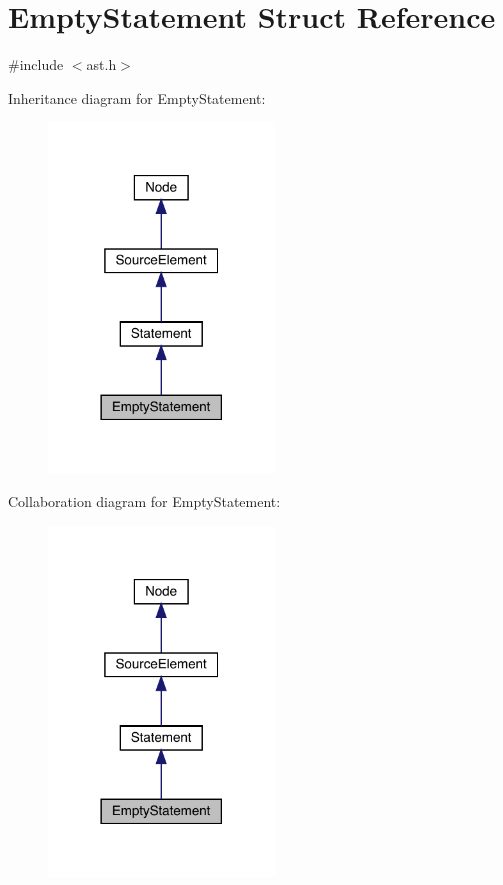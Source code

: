 \hypertarget{struct_empty_statement}{}\section{Empty\+Statement Struct Reference}
\label{struct_empty_statement}


{\ttfamily \#include $<$ast.\+h$>$}



Inheritance diagram for Empty\+Statement\+:\nopagebreak
\begin{figure}[H]
\begin{center}
\leavevmode
\includegraphics[width=170pt]{struct_empty_statement__inherit__graph}
\end{center}
\end{figure}


Collaboration diagram for Empty\+Statement\+:\nopagebreak
\begin{figure}[H]
\begin{center}
\leavevmode
\includegraphics[width=170pt]{struct_empty_statement__coll__graph}
\end{center}
\end{figure}
